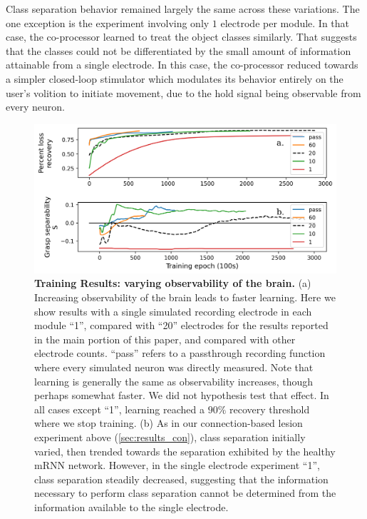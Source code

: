 \documentclass[12pt]{iopart}
\begin{document}
Class separation behavior remained largely the same across these variations.
The one exception is the experiment involving only $1$ electrode per module.
In that case, the co-processor learned to treat the object classes
similarly. That suggests that the classes could not be differentiated by
the small amount of information attainable from a single electrode. In this
case, the co-processor reduced towards a simpler closed-loop stimulator
which modulates its behavior entirely on the user's volition to initiate
movement, due to the hold signal being observable from every neuron.

\begin{figure}[h!]
\centering
\includegraphics[scale=0.7]{training_results_observability.png}
\caption{\textbf{Training Results: varying observability of the brain.}
         (a) Increasing observability of the brain leads to faster learning. Here
         we show results with a single simulated recording electrode in each module
         ``1'', compared with ``20'' electrodes for the results reported in the main
         portion of this paper, and compared with other electrode counts. ``pass''
         refers to a passthrough recording function where every simulated neuron was
         directly measured. Note that learning is generally the same as observability
         increases, though perhaps somewhat faster. We did not hypothesis test that effect.
         In all cases except ``1'', learning reached a $90\%$ recovery threshold where
         we stop training. (b) As in our connection-based lesion experiment above
         (\ref{sec:results_con}), class separation initially varied, then trended towards the
         separation exhibited by the healthy mRNN network. However, in
         the single electrode experiment ``1'', class separation steadily decreased, suggesting
         that the information necessary to perform class separation cannot be determined from
         the information available to the single electrode.}
\label{fig:results_observability}
\end{figure}
\end{document}
